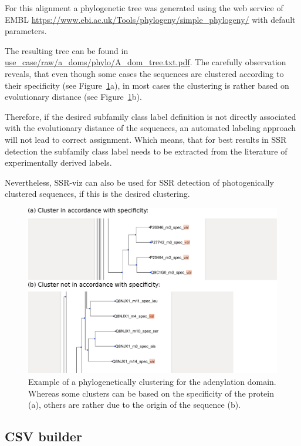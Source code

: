 \documentclass[a4paper,10pt]{article}
\begin{document}
For this alignment a phylogenetic tree was generated using the
web service of EMBL \url{https://www.ebi.ac.uk/Tools/phylogeny/simple_phylogeny/} with 
default parameters.

The resulting tree can be found in \url{use_case/raw/a_doms/phylo/A_dom_tree.txt.pdf}.
The carefully observation reveals, that even though some cases the sequences are clustered according to their specificity (see Figure~\ref{fig:cluster}a),
in most cases the clustering is rather based on evolutionary distance (see Figure~\ref{fig:cluster}b).

Therefore, 
if the desired subfamily class label definition is not 
directly associated with the evolutionary distance of the sequences,
an automated labeling approach will not lead to correct assignment.
Which means, that for best results in SSR detection the subfamily class label needs to be extracted from the literature
of experimentally derived labels.  

Nevertheless, SSR-viz can also be used for SSR detection of photogenically clustered sequences, if this 
is the desired clustering. 

\begin{figure}
  \includegraphics[width=\linewidth]{./figs/cluster}
  \caption{Example of a phylogenetically clustering for the adenylation domain. Whereas some
  clusters can be based on the specificity of the protein (a), others are rather due to the origin of the sequence (b).}
  \label{fig:cluster}
\end{figure}


\subsection{CSV builder}
\end{document}
